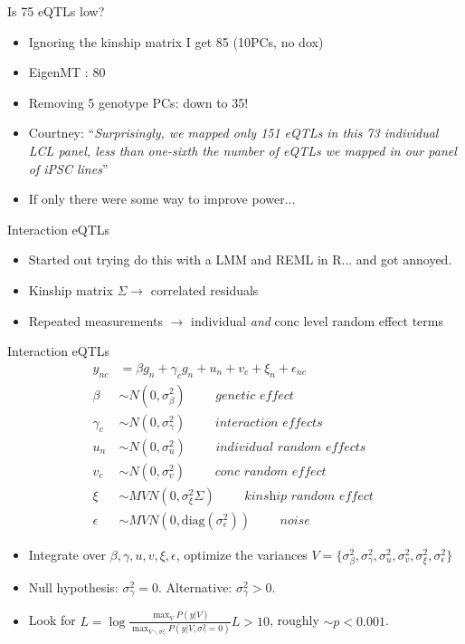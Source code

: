 \documentclass{beamer}
\begin{document}
\begin{frame}{Is 75 eQTLs low?}
\begin{itemize}
\item Ignoring the kinship matrix I get 85 (10PCs, no dox)
\item EigenMT \citep{davis2016efficient}: 80
\item Removing 5 genotype PCs: down to 35! 
\item Courtney: ``\emph{Surprisingly, we mapped only 151 eQTLs in this 73 individual LCL panel, less than one-sixth the number of eQTLs we mapped in our panel of iPSC lines}''
\item If only there were some way to improve power...
\end{itemize}
\end{frame}

\begin{frame}{Interaction eQTLs}
\begin{itemize}
\item Started out trying do this with a LMM and REML in R... and got annoyed. 
\item Kinship matrix $\Sigma \rightarrow$ correlated residuals
\item Repeated measurements $\rightarrow$ individual \emph{and} conc level random effect terms
\end{itemize}
\end{frame}


\begin{frame}{Interaction eQTLs}
\begin{align*}
y_{nc} &= \beta g_n + \gamma_c g_n + u_n + v_c + \xi_n + \epsilon_{nc} \\
\beta &\sim N(0, \sigma^2_\beta ) \qquad \textit{ genetic effect }  \\
\gamma_c &\sim N(0, \sigma^2_\gamma ) \qquad \textit{ interaction effects }  \\
u_n &\sim N(0, \sigma^2_u) \qquad \textit{ individual random effects } \\
v_c &\sim N(0, \sigma^2_v)  \qquad \textit{ conc random effect } \\
\xi &\sim MVN(0, \sigma^2_\xi \Sigma ) \qquad \textit{ kinship random effect }  \\
\epsilon &\sim MVN(0, \text{diag}(\sigma^2_\epsilon)) \qquad \textit{ noise } 
\end{align*}
\begin{itemize}
\item Integrate over $\beta, \gamma, u, v, \xi, \epsilon$, optimize the variances $V=\{ \sigma^2_\beta, \sigma^2_\gamma,  \sigma^2_u, \sigma^2_v,  \sigma^2_\xi, \sigma^2_\epsilon \}$
\item Null hypothesis: $\sigma^2_\gamma = 0$. Alternative: $\sigma^2_\gamma > 0$.
\item Look for
$
L=\log\frac{ \max_V P( y | V ) }{ \max_{V \backslash \sigma^2_\gamma} P(y | V, \sigma^2_\gamma=0 ) }
L > 10$, roughly $ \sim p < 0.001$. 
\end{itemize}
\end{frame}
\end{document}
